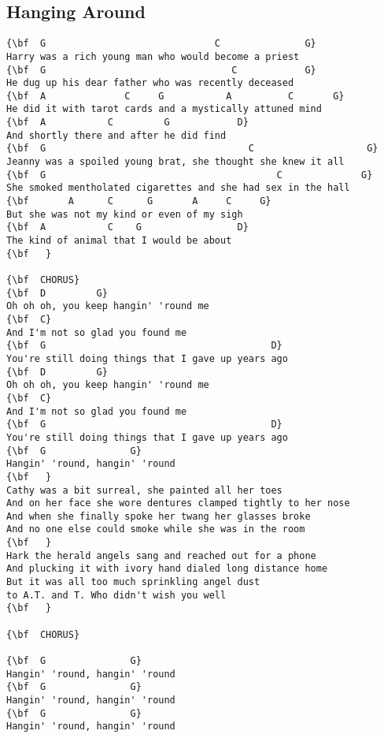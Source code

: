 \documentclass[a4paper]{article}
\begin{document}
\subsection{Hanging Around}
\begin{Verbatim}[commandchars=\\\{\}]
{\bf  G                              C               G}
Harry was a rich young man who would become a priest
{\bf  G                                 C            G}
He dug up his dear father who was recently deceased
{\bf  A              C     G           A          C       G}
He did it with tarot cards and a mystically attuned mind
{\bf  A           C         G            D}
And shortly there and after he did find
{\bf  G                                    C                    G}
Jeanny was a spoiled young brat, she thought she knew it all
{\bf  G                                         C              G}
She smoked mentholated cigarettes and she had sex in the hall
{\bf       A      C      G       A     C     G}
But she was not my kind or even of my sigh
{\bf  A           C    G                 D}
The kind of animal that I would be about
{\bf   }

{\bf  CHORUS}
{\bf  D         G}
Oh oh oh, you keep hangin' 'round me
{\bf  C}
And I'm not so glad you found me
{\bf  G                                        D}
You're still doing things that I gave up years ago
{\bf  D         G}
Oh oh oh, you keep hangin' 'round me
{\bf  C}
And I'm not so glad you found me
{\bf  G                                        D}
You're still doing things that I gave up years ago
{\bf  G               G}
Hangin' 'round, hangin' 'round
{\bf   }
Cathy was a bit surreal, she painted all her toes
And on her face she wore dentures clamped tightly to her nose
And when she finally spoke her twang her glasses broke
And no one else could smoke while she was in the room
{\bf   }
Hark the herald angels sang and reached out for a phone
And plucking it with ivory hand dialed long distance home
But it was all too much sprinkling angel dust
to A.T. and T. Who didn't wish you well
{\bf   }

{\bf  CHORUS}

{\bf  G               G}
Hangin' 'round, hangin' 'round
{\bf  G               G}
Hangin' 'round, hangin' 'round
{\bf  G               G}
Hangin' 'round, hangin' 'round

\end{Verbatim}
\newpage
\end{document}
